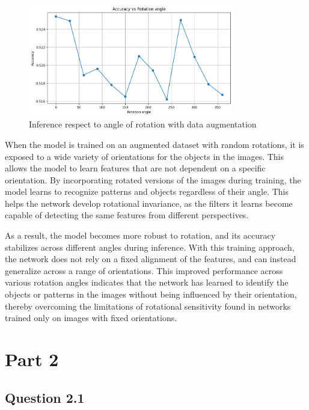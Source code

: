 \documentclass{article}
\begin{document}
\begin{figure}[H]
    \centering
    \includegraphics[width=0.8\textwidth]{images/rot_angles_aug.png}
    \caption{Inference respect to angle of rotation with data augmentation}
    \label{fig:angle_inference_aug}
\end{figure}

When the model is trained on an augmented dataset with random rotations, it is exposed to a wide variety of orientations for
the objects in the images. This allows the model to learn features that are not dependent on a specific orientation. By
incorporating rotated versions of the images during training, the model learns to recognize patterns and objects regardless
of their angle. This helps the network develop rotational invariance, as the filters it learns become capable of detecting
the same features from different perspectives.

As a result, the model becomes more robust to rotation, and its accuracy stabilizes across different angles during inference.
With this training approach, the network does not rely on a fixed alignment of the features, and can instead generalize across
a range of orientations. This improved performance across various rotation angles indicates that the network has learned to
identify the objects or patterns in the images without being influenced by their orientation, thereby overcoming the limitations
of rotational sensitivity found in networks trained only on images with fixed orientations.

\newpage

\section*{Part 2}

\subsection*{Question 2.1}
\end{document}
